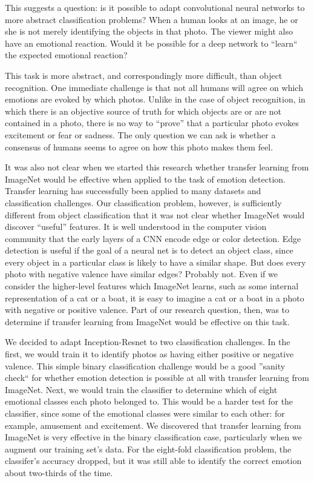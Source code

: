 \documentclass[10pt,twocolumn,letterpaper]{article}
\begin{document}
This suggests a question: is it possible to adapt convolutional neural networks to more abstract classification problems? When a human looks at an image, he or she is not merely identifying the objects in that photo. The viewer might also have an emotional reaction. Would it be possible for a deep network to ``learn`` the expected emotional reaction?

This task is more abstract, and correspondingly more difficult, than object recognition. One immediate challenge is that not all humans will agree on which emotions are evoked by which photos. Unlike in the case of object recognition, in which there is an objective source of truth for which objects are or are not contained in a photo, there is no way to ``prove'' that a particular photo evokes excitement or fear or sadness. The only question we can ask is whether a consensus of humans seems to agree on how this photo makes them feel.

It was also not clear when we started this research whether transfer learning from ImageNet would be effective when applied to the task of emotion detection. Transfer learning has successfully been applied to many datasets and classification challenges\cite{transferlearning}. Our classification problem, however, is sufficiently different from object classification that it was not clear whether ImageNet would discover ``useful'' features. It is well understood in the computer vision community that the early layers of a CNN encode edge or color detection. Edge detection is useful if the goal of a neural net is to detect an object class, since every object in a particular class is likely to have a similar shape. But does every photo with negative valence have similar edges? Probably not. Even if we consider the higher-level features which ImageNet learns, such as some internal representation of a cat or a boat, it is easy to imagine a cat or a boat in a photo with negative or positive valence. Part of our research question, then, was to determine if transfer learning from ImageNet would be effective on this task.

We decided to adapt Inception-Resnet to two classification challenges. In the first, we would train it to identify photos as having either positive or negative valence. This simple binary classification challenge would be a good ''sanity check`` for whether emotion detection is possible at all with transfer learning from ImageNet. Next, we would train the classifier to determine which of eight emotional classes each photo belonged to. This would be a harder test for the classifier, since some of the emotional classes were similar to each other: for example, amusement and excitement. We discovered that transfer learning from ImageNet is very effective in the binary classification case, particularly when we augment our training set's data. For the eight-fold classification problem, the classifer's accuracy dropped, but it was still able to identify the correct emotion about two-thirds of the time.
\end{document}
